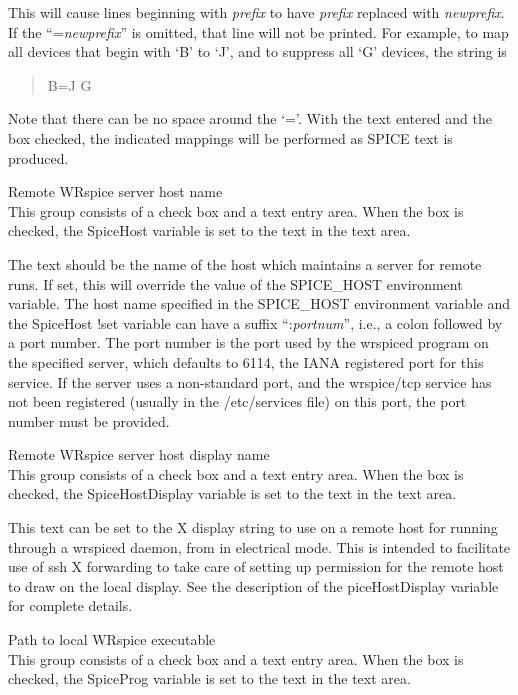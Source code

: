 \begin{description}
This will cause lines beginning with {\it prefix} to have {\it prefix}
replaced with {\it newprefix}.  If the ``{\vt =}{\it newprefix\/}'' is
omitted, that line will not be printed.  For example, to map all
devices that begin with `B' to `J', and to suppress all `G' devices,
the string is

\begin{quote} \vt
B=J G
\end{quote}

Note that there can be no space around the `{\vt =}'.  With the text
entered and the box checked, the indicated mappings will be performed
as SPICE text is produced.

\item{\cb Remote WRspice server host name}\\
This group consists of a check box and a text entry area.  When the
box is checked, the {\et SpiceHost} variable is set to the text in the
text area.

The text should be the name of the host which maintains a server for
remote {\WRspice} runs.  If set, this will override the value of the
{\et SPICE\_HOST} environment variable.  The host name specified in
the {\et SPICE\_HOST} environment variable and the {\et SpiceHost}
{\cb !set} variable can have a suffix ``{\vt :}{\it portnum\/}'',
i.e., a colon followed by a port number.  The port number is the port
used by the {\vt wrspiced} program on the specified server, which
defaults to 6114, the IANA registered port for this service.  If the
server uses a non-standard port, and the {\vt wrspice/tcp} service has
not been registered (usually in the {\vt /etc/services} file) on this
port, the port number must be provided.

\item{\cb Remote WRspice server host display name}\\
This group consists of a check box and a text entry area.  When the
box is checked, the {\et SpiceHostDisplay} variable is set to the text
in the text area.

This text can be set to the X display string to use on a remote host
for running {\WRspice} through a {\vt wrspiced} daemon, from {\Xic} in
electrical mode.  This is intended to facilitate use of {\vt ssh} X
forwarding to take care of setting up permission for the remote host
to draw on the local display.  See the description of the {\et
piceHostDisplay} variable for complete details.

\item{\cb Path to local WRspice executable}\\
This group consists of a check box and a text entry area.  When the
box is checked, the {\et SpiceProg} variable is set to the text in the
text area.


\end{description}
